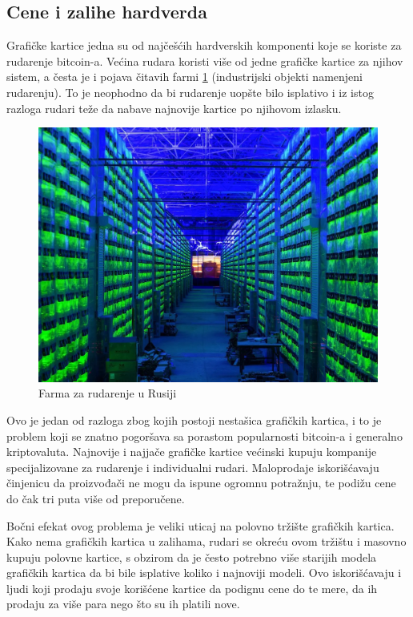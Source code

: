 \documentclass[a4paper]{article}
\begin{document}
\subsection{Cene i zalihe hardverda }

Grafičke kartice jedna su od najčešćih hardverskih komponenti koje se koriste za rudarenje bitcoin-a. Većina rudara koristi više od jedne grafičke kartice za njihov sistem, a česta je i pojava čitavih farmi \ref{fig:farma} (industrijski objekti namenjeni rudarenju). To je neophodno da bi rudarenje uopšte bilo isplativo i iz istog razloga rudari teže da nabave najnovije kartice po njihovom izlasku.

\noindent%
\begin{figure}[h!]
	\begin{center}
		\includegraphics[scale=0.25]{farma.jpg}
	\end{center}
	\caption{Farma za rudarenje u Rusiji}
	\label{fig:farma}
\end{figure}

Ovo je jedan od razloga zbog kojih postoji nestašica grafičkih kartica, i to je problem koji se znatno pogoršava sa porastom popularnosti bitcoin-a i generalno kriptovaluta. Najnovije i najjače grafičke kartice većinski kupuju kompanije specijalizovane za rudarenje i individualni rudari. Maloprodaje iskorišćavaju činjenicu da proizvođači ne mogu da ispune ogromnu potražnju, te podižu cene do čak tri puta više od preporučene.

Bočni efekat ovog problema je veliki uticaj na polovno tržište grafičkih kartica. Kako nema grafičkih kartica u zalihama, rudari se okreću ovom tržištu i masovno kupuju polovne kartice, s obzirom da je često potrebno više starijih modela grafičkih kartica da bi bile isplative koliko i najnoviji modeli. Ovo iskorišćavaju i ljudi koji prodaju svoje korišćene kartice da podignu cene do te mere, da ih prodaju za više para nego što su ih platili nove.
\end{document}
